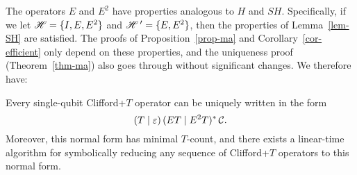 The operators $E$ and $E^2$ have properties analogous to $H$ and $SH$. Specifically, if we let $\mathscr{H}
= \{I,E,E^2\}$ and $\mathscr{H}\,' = \{E,E^2\}$, then the properties of Lemma~\ref{lem-SH} are satisfied. The
proofs of Proposition~\ref{prop-ma} and Corollary~\ref{cor-efficient} only depend on these
properties, and the uniqueness proof (Theorem~\ref{thm-ma}) also goes through without significant
changes. We therefore have:

\begin{proposition}
  Every single-qubit Clifford+$T$ operator can be uniquely written in the form
  \begin{equation}\label{eqn-et}
    (T\mid\varepsilon)\,(ET\mid E^2T)^*\,{{\mathcal C}}.
  \end{equation}
  Moreover, this normal form has minimal $T$-count, and there exists a linear-time algorithm for
  symbolically reducing any sequence of Clifford+$T$ operators to this normal form.
\end{proposition}


